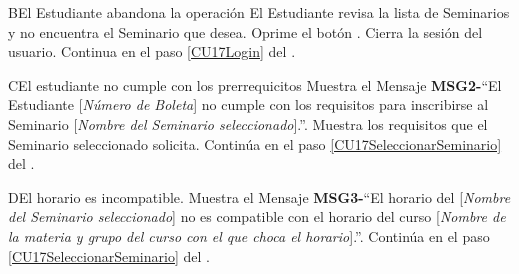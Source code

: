 		\begin{UCtrayectoriaA}{B}{El Estudiante abandona la operación}
			\UCpaso El Estudiante revisa la lista de Seminarios y no encuentra el Seminario que desea.
			\UCpaso[\UCactor] Oprime el botón .
			\UCpaso Cierra la sesión del usuario.
			\UCpaso Continua en el paso \ref{CU17Login} del .
		\end{UCtrayectoriaA}

		\begin{UCtrayectoriaA}{C}{El estudiante no cumple con los prerrequicitos}
			\UCpaso Muestra el Mensaje {\bf MSG2-}``El Estudiante [{\em Número de Boleta}] no cumple con los requisitos para inscribirse al Seminario [{\em Nombre del Seminario seleccionado}].''.
			\UCpaso Muestra los requisitos que el Seminario seleccionado solicita.
			\UCpaso Continúa en el paso \ref{CU17SeleccionarSeminario} del .
		\end{UCtrayectoriaA}

		\begin{UCtrayectoriaA}{D}{El horario es incompatible.}
			\UCpaso Muestra el Mensaje {\bf MSG3-}``El horario del [{\em Nombre del Seminario seleccionado}] no es compatible con el horario del curso [{\em Nombre de la materia y grupo del curso con el que choca el horario}].''.
			\UCpaso Continúa en el paso \ref{CU17SeleccionarSeminario} del .
		\end{UCtrayectoriaA}
		
